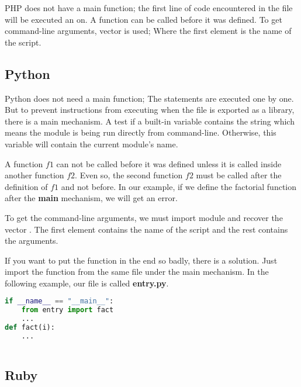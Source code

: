 \documentclass{KodeBook}
\begin{document}
PHP does not have a main function; the first line of code encountered in the file will be executed an on.
A function can be called before it was defined. 
To get command-line arguments,  vector is used; Where the first element is the name of the script.



\subsection{Python}

Python does not need a main function; The statements are executed one by one. 
But to prevent instructions from executing when the file is exported as a library, there is a main mechanism. 
A test if a built-in variable  contains the string  which means the module is being run directly from command-line.
Otherwise, this variable will contain the current module's name.

A function $ f1 $ can not be called before it was defined unless it is called inside another function $ f2 $. 
Even so, the second function $ f2 $ must be called after the definition of $ f1 $ and not before. 
In our example, if we define the factorial function after the \textbf{main} mechanism, we will get an error. 

To get the command-line arguments, we must import  module and recover the vector . 
The first element contains the name of the script and the rest contains the arguments.



If you want to put the function in the end so badly, there is a solution. 
Just import the function from the same file under the main mechanism. 
In the following example, our file is called \textbf{entry.py}.

\begin{lstlisting}[language=Python, style=codeStyle]
if __name__ == "__main__":
	from entry import fact
	...
def fact(i):
	...
	
\end{lstlisting}

\subsection{Ruby}
\end{document}
